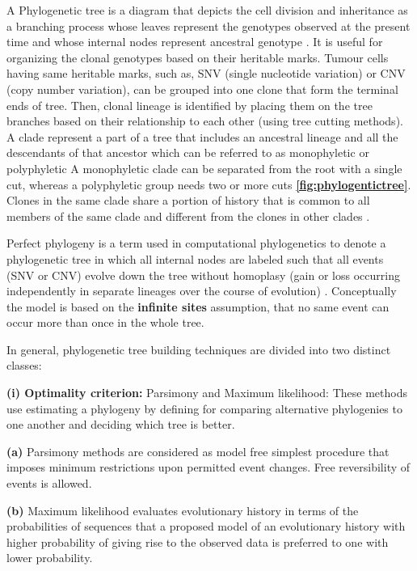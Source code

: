 A Phylogenetic tree is a diagram that depicts the cell division and inheritance as a branching process whose leaves represent the genotypes observed at the present time and whose internal nodes represent ancestral genotype \cite{satas2020scarlet}.
It is useful for organizing the clonal genotypes based on their heritable marks. Tumour cells having same heritable marks, such as, SNV (single nucleotide variation) or CNV (copy number variation), can be grouped into one clone that form the terminal ends of tree. Then, clonal lineage is identified by placing them on the tree branches based on their relationship to each other (using tree cutting methods). A clade represent a part of a tree that includes an ancestral lineage and all the descendants of that ancestor which can be referred to as monophyletic or polyphyletic  A monophyletic clade can be separated from the root with a single cut, whereas a polyphyletic group needs two or more cuts \textbf{\autoref{fig:phylogentictree}}. Clones in the same clade share a portion of history that is common to all members of the same clade and different from the clones in other clades \cite{baum2008reading, baum2008phylogenics}.

Perfect phylogeny is a term used in computational phylogenetics to denote a phylogenetic tree in which all internal nodes are labeled such that all events (SNV or CNV) evolve down the tree without homoplasy (gain or loss occurring independently in separate lineages over the course of evolution) \cite{gusfield1997algorithms}. Conceptually the model is based on the \textbf{infinite sites} assumption, that no same event can occur more than once in the whole tree. 

In general, phylogenetic tree building techniques are divided into two distinct classes:

\textbf{(i) Optimality criterion:} Parsimony and Maximum likelihood: These methods use estimating a phylogeny by defining for comparing alternative phylogenies to one another and deciding which tree is better.

\textbf{(a)} Parsimony methods are considered as model free simplest procedure that imposes minimum restrictions upon permitted event changes. Free reversibility of events is allowed.

\textbf{(b)} Maximum likelihood evaluates evolutionary history in terms of the probabilities of sequences that a proposed model of an evolutionary history with higher probability of giving rise to the observed data is preferred to one with lower probability. 

